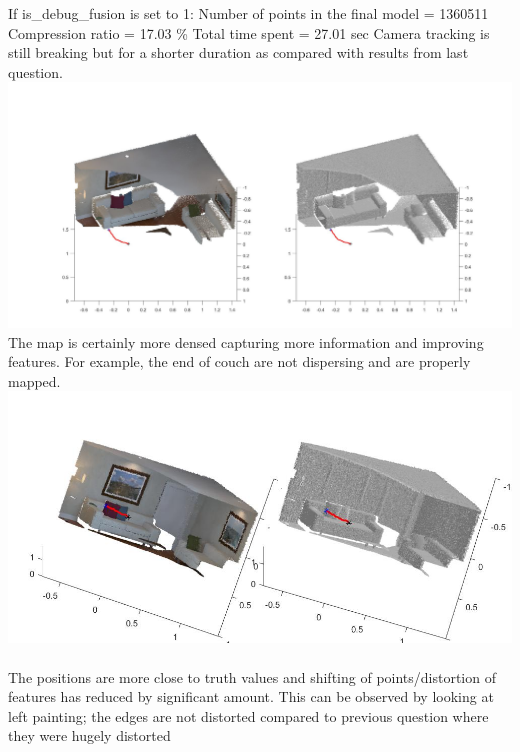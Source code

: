 \documentclass[fleqn]{article}
\begin{document}
\begin{adjustwidth}{4em}{0pt}
	If is\_debug\_fusion is set to 1: \newline
	Number of points in the final model = 1360511 \newline
	Compression ratio = 17.03 \% \newline
	Total time spent = 27.01 sec \newline
	Camera tracking is still breaking but for a shorter duration as compared with results from last question. \\
	\includegraphics[width = 1\textwidth,center]{slam_hw3_q2_d_part2_pic1.jpg}\\
	The map is certainly more densed capturing more information and improving features. For example, the end of couch are not dispersing and are properly mapped.\\
	\includegraphics[width = 1\textwidth,center]{slam_hw3_q2_d_part2_pic2.jpg}\\ \\
	The positions are more close to truth values and shifting of points/distortion of features has reduced by significant amount. This can be observed by looking at left painting; the edges are not distorted compared to previous question where they were hugely distorted \\

\end{adjustwidth}
\end{document}
